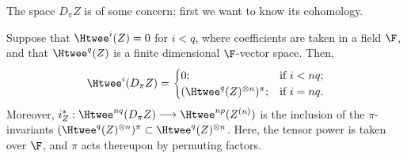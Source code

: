 The space $D_\pi Z$ is of some concern; first we want to know its cohomology.
\begin{lem}\label{lemaboutpiadic}
Suppose that $\Htwee^i (Z) = 0$ for $i < q$, where coefficients are taken in a field $\F$, and that $\Htwee^q (Z)$ is a finite dimensional $\F$-vector space.  Then,
\[\Htwee^i(D_\pi Z)=
\begin{cases}0;&\textup{if }i<nq;\\(\Htwee^q(Z)^{\otimes n})^\pi;&\textup{if }i=nq.%
\end{cases}
\]
Moreover, $i_Z^*:\Htwee^{nq}(D_\pi Z)\to \Htwee^{np}(Z^{(n)})$ is the inclusion of the $\pi$-invariants $(\Htwee^q(Z)^{\otimes n})^\pi\subset\Htwee^q(Z)^{\otimes n}$. Here, the tensor power is taken over $\F$, and $\pi$ acts thereupon by permuting factors.
\end{lem}
